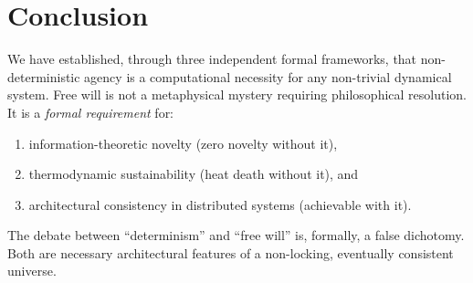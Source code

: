 \documentclass[12pt, a4paper]{article}
\theoremstyle{plain}
\theoremstyle{definition}
\begin{document}
\section{Conclusion}\label{sec:conclusion}

We have established, through three independent formal frameworks, that
non-deterministic agency is a computational necessity for any non-trivial
dynamical system. Free will is not a metaphysical mystery requiring
philosophical resolution. It is a \emph{formal requirement} for:

\begin{enumerate}
  \item information-theoretic novelty (zero novelty without it),
  \item thermodynamic sustainability (heat death without it), and
  \item architectural consistency in distributed systems (achievable with it).
\end{enumerate}

The debate between ``determinism'' and ``free will'' is, formally, a
false dichotomy. Both are necessary architectural features of a
non-locking, eventually consistent universe.


\vspace{2em}
\noindent\hrulefill
\vspace{1em}







\vspace{3em}
\noindent\hrulefill
\vspace{1em}
\end{document}
